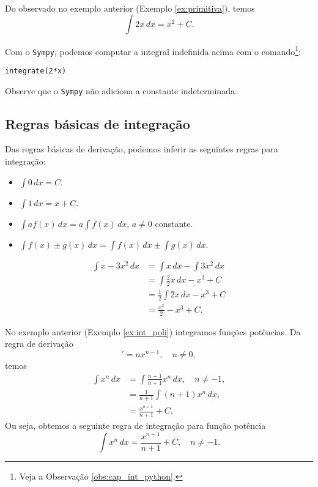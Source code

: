 \begin{ex}
  Do observado no exemplo anterior (Exemplo \ref{ex:primitiva}), temos
  \begin{equation}
    \int 2x\,dx = x^2 + C.
  \end{equation}

  \ifispython
  Com o \verb+Sympy+, podemos computar a integral indefinida acima com o comando\footnote{Veja a Observação \ref{obs:cap_int_python}.}:
\begin{verbatim}
integrate(2*x)
\end{verbatim}
  \fi
  Observe que o \verb+Sympy+ não adiciona a constante indeterminada.
\end{ex}

\subsection{Regras básicas de integração}

Das regras básicas de derivação, podemos inferir as seguintes regras para integração:
\begin{itemize}
\item $\displaystyle \int 0\,dx = C$.
\item $\displaystyle \int 1\,dx = x + C$.
\item $\displaystyle \int af(x)\,dx = a\int f(x)\,dx$, $a\neq 0$ constante.
\item $\displaystyle \int f(x)\pm g(x)\,dx = \int f(x)\,dx \pm \int g(x)\,dx$.
\end{itemize}

\begin{ex}\label{ex:int_poli}
  \begin{align}
    \int x - 3x^2\,dx &= \int x\,dx - \int 3x^2\,dx\\
                      &= \int \frac{2}{2}x\,dx - x^3 + C\\
                      &= \frac{1}{2}\int 2x\,dx - x^3 + C\\
                      &= \frac{x^2}{2} - x^3 + C.
  \end{align}
\end{ex}

No exemplo anterior (Exemplo \ref{ex:int_poli}) integramos funções potências. Da regra de derivação
\begin{equation}
  [x^n]' = nx^{n-1}, \quad n\neq 0,
\end{equation}
temos
\begin{align}
  \int x^n\,dx &= \int \frac{n+1}{n+1}x^n\,dx, \quad n\neq -1,\\
               &= \frac{1}{n+1}\int (n+1)x^n\,dx,\\
               &= \frac{x^{n+1}}{n+1} + C.
\end{align}
Ou seja, obtemos a seguinte regra de integração para função potência
\begin{equation}
  \int x^n\,dx = \frac{x^{n+1}}{n+1} + C, \quad n\neq -1.
\end{equation}

